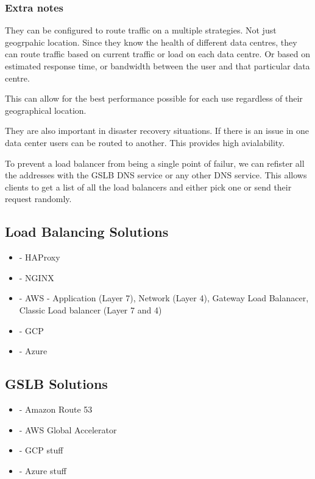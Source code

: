 \documentclass[a4paper, 11pt]{book}
\begin{document}
    \subsubsection{Extra notes}
    They can be configured to route traffic on a multiple strategies. Not just geogrpahic location.
    Since they know the health of different data centres, they can route traffic based on current traffic or load on each data centre.
    Or based on estimated response time, or bandwidth between the user and that particular data centre.

    This can allow for the best performance possible for each use regardless of their geographical location.

    They are also important in disaster recovery situations. If there is an issue in one data center users can be routed to another.
    This provides high avialability.

    To prevent a load balancer from being a single point of failur, we can refister all the addresses with the GSLB DNS service or any other DNS service.
    This allows clients to get a list of all the load balancers and either pick one or send their request randomly.

    \subsection{Load Balancing Solutions}
    \begin{itemize}
        \item - HAProxy
        \item - NGINX
        \item - AWS - Application (Layer 7), Network (Layer 4), Gateway Load Balanacer, Classic Load balancer (Layer 7 and 4)
        \item - GCP %
        \item - Azure %
    \end{itemize}

    \subsection{GSLB Solutions}
    \begin{itemize}
        \item - Amazon Route 53
        \item - AWS Global Accelerator
        \item - GCP stuff
        \item - Azure stuff
    \end{itemize}
\end{document}
